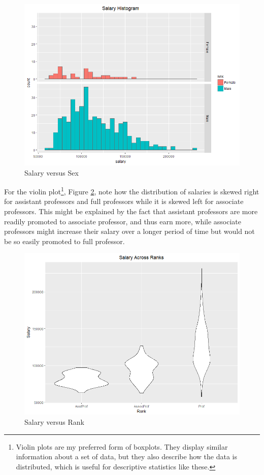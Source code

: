\documentclass{article}
\begin{document}
\newpage

\begin{figure}[!htb]
    \centering
    \includegraphics[scale=0.5]{salarySex}
    \caption{Salary versus Sex}
    \label{pairs2}
\end{figure}

For the violin plot\footnote{Violin plots are my preferred form of boxplots. They display similar information about a set of data, but they also describe how the data is distributed, which is useful for descriptive statistics like these.}, Figure \ref{pairs3}, note how the distribution of salaries is skewed right for assistant professors and full professors while it is skewed left for associate professors. This might be explained by the fact that assistant professors are more readily promoted to associate professor, and thus earn more, while associate professors might increase their salary over a longer period of time but would not be so easily promoted to full professor.


\begin{figure}[!htb]
    \centering
    \includegraphics[scale=0.5]{salaryRank}
    \caption{Salary versus Rank}
    \label{pairs3}
\end{figure}
\end{document}
